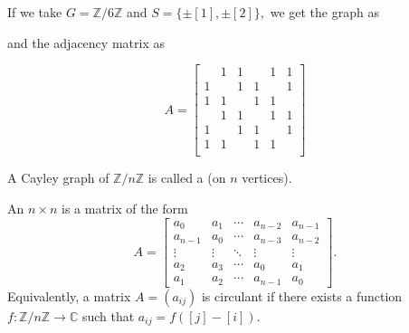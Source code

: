 \documentclass[12pt]{article}	%
\begin{document}
\begin{ex}
    If we take $G = \mathbb{Z}/6\mathbb{Z}$ and $S = \{\pm [1], \pm [2]\},$ we get the graph as
    \begin{center}
        \captionsetup{type=figure}
         \label{fig:cayleyz6z}
    \end{center}

    and the adjacency matrix as

    \begin{equation*} 
        A = \begin{bmatrix}
              & 1 & 1 &   & 1 & 1 \\
            1 &   & 1 & 1 &   & 1 \\
            1 & 1 &   & 1 & 1 &   \\
              & 1 & 1 &   & 1 & 1 \\
            1 &   & 1 & 1 &   & 1 \\
            1 & 1 &   & 1 & 1 &   \\
        \end{bmatrix}
    \end{equation*}
\end{ex}

\begin{defn}%
    A Cayley graph of $\mathbb{Z}/n\mathbb{Z}$ is called a  (on $n$ vertices).
\end{defn}

\begin{defn}%
    An $n \times n$  is a matrix of the form
    \begin{equation*} 
        A = \begin{bmatrix}
            a_0 & a_1 & \cdots & a_{n - 2} & a_{n - 1} \\
            a_{n - 1} & a_0 & \cdots & a_{n - 3} & a_{n - 2}\\
            \vdots & \vdots & \ddots & \vdots & \vdots \\
            a_2 & a_3 & \cdots & a_{0} & a_1\\
            a_1 & a_2 & \cdots & a_{n - 1} & a_0
        \end{bmatrix}.
    \end{equation*}
    Equivalently, a matrix $A = (a_{ij})$ is circulant if there exists a function $f : \mathbb{Z}/n\mathbb{Z} \to \mathbb{C}$ such that $a_{ij} = f([j] - [i]).$
\end{defn} 
\end{document}
